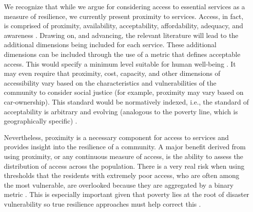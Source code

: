 \documentclass[9pt,twocolumn,twoside,lineno]{pnas-new}
\begin{document}
We recognize that while we argue for considering access to essential services as a measure of resilience, we  currently present proximity to services. 
Access, in fact, is comprised of proximity, availability, acceptability, affordability, adequacy, and awareness \cite{Saurman2016-gj, Penchansky1981-qh}. 
Drawing on, and advancing, the relevant literature will lead to the additional dimensions being included for each service. 
These additional dimensions can be included through the use of a metric that defines acceptable access. 
This would specify a minimum level suitable for human well-being \cite{Doorn2018-fx}.
It may even require that proximity, cost, capacity, and other dimensions of accessibility vary based on the characteristics and vulnerabilities of the community to consider social justice (for example, proximity may vary based on car-ownership).
This standard would be normatively indexed, i.e., the standard of acceptability is arbitrary and evolving (analogous to the poverty line, which is geographically specific) \cite{Constas2014-ui}.

Nevertheless, proximity is a necessary component for access to services and provides insight into the resilience of a community. 
A major benefit derived from using proximity, or any continuous measure of access, is the ability to assess the distribution of access across the population. 
There is a very real risk when using thresholds that the residents with extremely poor access, who are often among the most vulnerable, are overlooked because they are aggregated by a binary metric \cite{Logan2017-fr}. 
This is especially important given that poverty lies at the root of disaster vulnerability so true resilience approaches must help correct this \cite{Pantelic1991-qu}.

\end{document}
